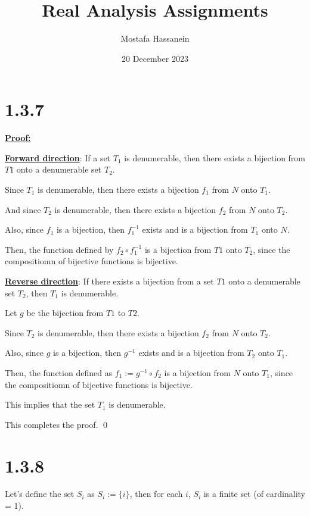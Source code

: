 \documentclass{article}
\author{Mostafa Hassanein}
\title{Real Analysis Assignments}
\date{20 December 2023}
\begin{document}
\maketitle

\newpage

\section*{1.3.7}
\textbf{\underline{Proof:}}
\newline

\noindent
\textbf{\underline{Forward direction}}: If a set $T_1$ is denumerable, then there exists a bijection from $T1$ onto a denumerable set $T_2$. 
\newline

\noindent 
Since $T_1$ is denumerable, then there exists a bijection $f_1$ from $N$ onto $T_1$.

\noindent
And since $T_2$ is denumerable, then there exists a bijection $f_2$ from $N$ onto $T_2$.

\noindent
Also, since $f_1$ is a bijection, then $f_1^{-1}$ exists and is a bijection from $T_1$ onto $N$.

\noindent
Then, the function defined by $f_2 \circ f_1^{-1}$ is a bijection from $T1$ onto $T_2$, since the compositiomn of bijective functions is bijective.
\newline

\noindent
\textbf{\underline{Reverse direction}}: If there exists a bijection from a set $T1$ onto a denumerable set $T_2$, then $T_1$ is denumerable.
\newline

\noindent
Let $g$ be the bijection from $T1$ to $T2$.

\noindent
Since $T_2$ is denumerable, then there exists a bijection $f_2$ from $N$ onto $T_2$.

\noindent
Also, since $g$ is a bijection, then $g^{-1}$ exists and is a bijection from $T_2$ onto $T_1$.

\noindent
Then, the function defined as $f_1 := g^{-1} \circ f_2$ is a bijection from $N$ onto $T_1$, since the compositiomn of bijective functions is bijective.

\noindent
This implies that the set $T_1$ is denumerable.
\newline

\noindent
This completes the proof.
\qed

\section*{1.3.8}
Let's define the set $S_i$ as $S_i:=\{i\}$, then for each $i$, $S_i$ is a finite set (of cardinality = 1). 
\end{document}
